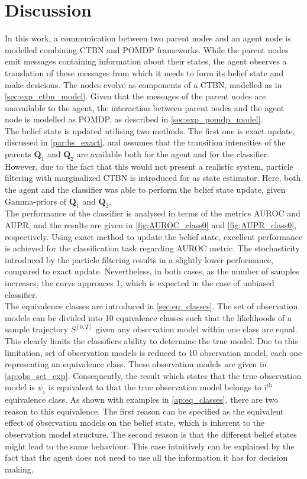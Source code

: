 \chapter{Discussion}
\label{chap:5}
In this work, a communication between two parent nodes and an agent node is modelled combining CTBN and POMDP frameworks. While the parent nodes emit messages containing information about their states, the agent observes a translation of these messages from which it needs to form its belief state and make desicions. The nodes evolve as components of a CTBN, modelled as in \cref{sec:exp_ctbn_model}. Given that the messages of the parent nodes are unavailable to the agent, the interaction between parent nodes and the agent node is modelled as POMDP, as described in \cref{sec:exp_pomdp_model}.\\
The belief state is updated utilising two methods. The first one is exact update, discussed in \cref{par:bs_exact}, and assumes that the transition intensities of the parents $ \textbf{Q}_1 $ and $ \textbf{Q}_2 $ are available both for the agent and for the classifier. However, due to the fact that this would not present a realistic system, particle filtering with marginalized CTBN is introduced for as state estimator. Here, both the agent and the classifier was able to perform the belief state update, given Gamma-priors of $ \textbf{Q}_1 $ and $ \textbf{Q}_2 $.\\
The performance of the classifier is analysed in terms of the metrics AUROC and AUPR, and the results are given in \autoref{fig:AUROC_class0} and \autoref{fig:AUPR_class0}, respectively. Using exact method to update the belief state, excellent performance is achieved for the classification task regarding AUROC metric. The stochasticity introduced by the particle filtering results in a slightly lower performance, compared to exact update. Nevertheless, in both cases, as the number of samples increases, the curve approaces 1, which is expected in the case of unbiased classifier.\\
The equivalence classes are introduced in \cref{sec:eq_classes}. The set of observation models can be divided into 10 equivalence classes such that the likelihoods of a sample trajectory $ S^{[0,T]} $ given any observation model within one class are equal. This clearly limits the classifiers ability to determine the true model. Due to this limitation, set of observation models is reduced to 10 observation model, each one representing an equivalence class. These observation models are given in \cref{ap:obs_set_exp}. Consequently, the result which states that the true observation model is $ \psi_i $ is equivalent to that the true observation model belongs to $ \text{i}^{\text{th}} $ equivalence class. As shown with examples in \cref{ap:eq_classes}, there are two reason to this equivalence. The first reason can be specified as the equivalent effect of observation models on the belief state, which is inherent to the observation model structure. The second reason is that the different belief states might lead to the same behaviour. This case intuitively can be explained by the fact that the agent does not need to use all the information it has for decision making.\\
